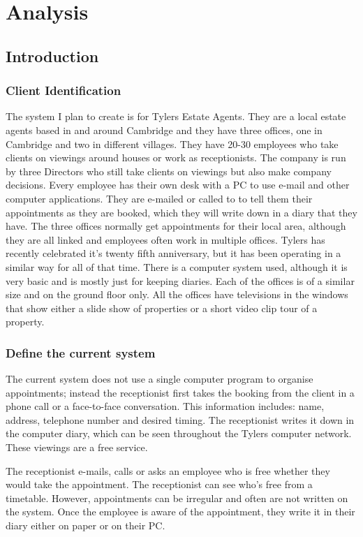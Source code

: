 \chapter{Analysis}
\section{Introduction}
\subsection{Client Identification}
The system I plan to create is for Tylers Estate Agents. They are a local estate agents based in and around Cambridge and they have three offices, one in Cambridge and two in different villages. They have 20-30 employees who take clients on viewings around houses or work as receptionists. The company is run by three Directors who still take clients on viewings but also make company decisions. Every employee has their own desk with a PC to use e-mail and other computer applications. They are e-mailed or called to to tell them their appointments as they are booked, which they will write down in a diary that they have. The three offices normally get appointments for their local area, although they are all linked and employees often work in multiple offices. Tylers has recently celebrated it's twenty fifth anniversary, but it has been operating in a similar way for all of that time. There is a computer system used, although it is very basic and is mostly just for keeping diaries. Each of the offices is of a similar size and on the ground floor only. All the offices have televisions in the windows that show either a slide show of properties or a short video clip tour of a property.

\subsection{Define the current system}
The current system does not use a single computer program to organise appointments; instead the receptionist first takes the booking from the client in a phone call or a face-to-face conversation. This information includes: name, address, telephone number and desired timing. The receptionist writes it down in the computer diary, which can be seen throughout the Tylers computer network. These viewings are a free service. 

The receptionist e-mails, calls or asks an employee who is free whether they would take the appointment. The receptionist can see who's free from a timetable. However, appointments can be irregular and often are not written on the system. Once the employee is aware of the appointment, they write it in their diary either on paper or on their PC.

